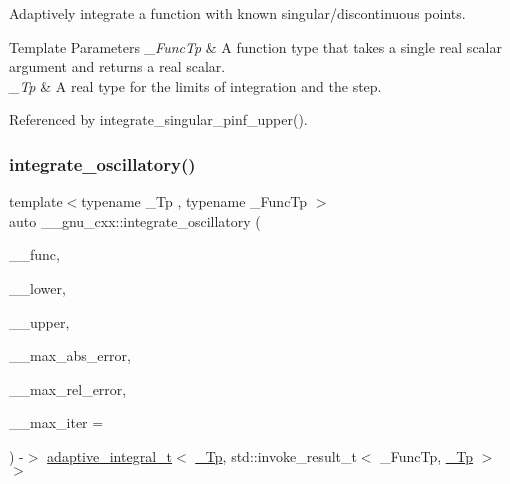 Adaptively integrate a function with known singular/discontinuous points.


\begin{DoxyTemplParams}{Template Parameters}
{\em \+\_\+\+Func\+Tp} & A function type that takes a single real scalar argument and returns a real scalar. \\
\hline
{\em \+\_\+\+Tp} & A real type for the limits of integration and the step. \\
\hline
\end{DoxyTemplParams}


Referenced by integrate\+\_\+singular\+\_\+pinf\+\_\+upper().

\mbox{\label{namespace____gnu__cxx_aa3b36aa34ddfb56a7c5b50438ca812c1}} 
\subsubsection{\texorpdfstring{integrate\+\_\+oscillatory()}{integrate\_oscillatory()}}
{\footnotesize\ttfamily template$<$typename \+\_\+\+Tp , typename \+\_\+\+Func\+Tp $>$ \\
auto \+\_\+\+\_\+gnu\+\_\+cxx\+::integrate\+\_\+oscillatory (\begin{DoxyParamCaption}\item[{\+\_\+\+Func\+Tp}]{\+\_\+\+\_\+func,  }\item[{\hyperlink{namespace____gnu__cxx_a3b19a9c800ca194374ef9172290f7d79}{\+\_\+\+Tp}}]{\+\_\+\+\_\+lower,  }\item[{\hyperlink{namespace____gnu__cxx_a3b19a9c800ca194374ef9172290f7d79}{\+\_\+\+Tp}}]{\+\_\+\+\_\+upper,  }\item[{\hyperlink{namespace____gnu__cxx_a3b19a9c800ca194374ef9172290f7d79}{\+\_\+\+Tp}}]{\+\_\+\+\_\+max\+\_\+abs\+\_\+error,  }\item[{\hyperlink{namespace____gnu__cxx_a3b19a9c800ca194374ef9172290f7d79}{\+\_\+\+Tp}}]{\+\_\+\+\_\+max\+\_\+rel\+\_\+error,  }\item[{std\+::size\+\_\+t}]{\+\_\+\+\_\+max\+\_\+iter = {} }\end{DoxyParamCaption}) -\/$>$  \hyperlink{struct____gnu__cxx_1_1adaptive__integral__t}{adaptive\+\_\+integral\+\_\+t}$<$ \hyperlink{namespace____gnu__cxx_a3b19a9c800ca194374ef9172290f7d79}{\+\_\+\+Tp}, std\+::invoke\+\_\+result\+\_\+t$<$ \+\_\+\+Func\+Tp, \hyperlink{namespace____gnu__cxx_a3b19a9c800ca194374ef9172290f7d79}{\+\_\+\+Tp} $>$$>$}

